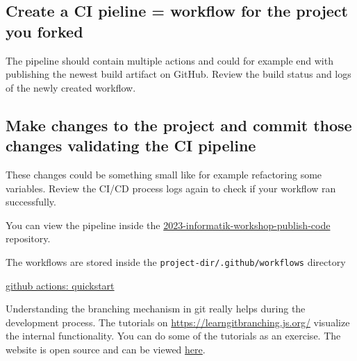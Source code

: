 \documentclass[paper=a4]{scrartcl}
\begin{document}
	\subsection*{Create a CI pieline = workflow for the project you forked} 
		The pipeline should contain multiple actions and could for example end with publishing the newest build artifact on GitHub. Review the build status and logs of the newly created workflow.
	
	\subsection*{Make changes to the project and commit those changes validating the CI pipeline}
		These changes could be something small like for example refactoring some variables. Review the CI/CD process logs again to check if your workflow ran successfully. 
		
	\begin{hints}
		\item You can view the pipeline inside the \href{https://github.com/marc-philipp-knechtle/2023-informatik-workshop-publish-code}{2023-informatik-workshop-publish-code} repository. 
		\item The workflows are stored inside the \texttt{project-dir/.github/workflows} directory
	\end{hints}
	
	\begin{literature}
		\item \href{https://docs.github.com/en/actions/quickstart}{github actions: quickstart}
	\end{literature}




	Understanding the branching mechanism in git really helps during the development process. The tutorials on \url{https://learngitbranching.js.org/} visualize the internal functionality. You can do some of the tutorials as an exercise. 
	\newline The website is open source and can be viewed \href{https://github.com/pcottle/learnGitBranchin}{here}. 
\end{document}
